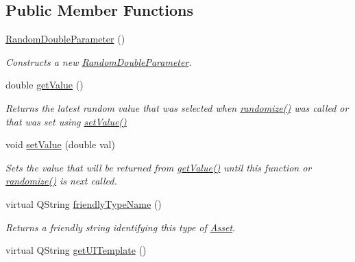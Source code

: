 \subsection*{Public Member Functions}
\begin{DoxyCompactItemize}
\item 
\hyperlink{class_picto_1_1_random_double_parameter_a0ef74a84ce113e2e763e620f9fd0c193}{Random\-Double\-Parameter} ()
\begin{DoxyCompactList}\small\item\em Constructs a new \hyperlink{class_picto_1_1_random_double_parameter}{Random\-Double\-Parameter}. \end{DoxyCompactList}\item 
\hypertarget{class_picto_1_1_random_double_parameter_a42879301cd3f7761460606ab1968e3db}{double \hyperlink{class_picto_1_1_random_double_parameter_a42879301cd3f7761460606ab1968e3db}{get\-Value} ()}\label{class_picto_1_1_random_double_parameter_a42879301cd3f7761460606ab1968e3db}

\begin{DoxyCompactList}\small\item\em Returns the latest random value that was selected when \hyperlink{class_picto_1_1_random_double_parameter_a8de295a1b08b19b4c413419df42fe7e9}{randomize()} was called or that was set using \hyperlink{class_picto_1_1_random_double_parameter_acb6abab52eecd696bf3c490c19054c52}{set\-Value()} \end{DoxyCompactList}\item 
\hypertarget{class_picto_1_1_random_double_parameter_acb6abab52eecd696bf3c490c19054c52}{void \hyperlink{class_picto_1_1_random_double_parameter_acb6abab52eecd696bf3c490c19054c52}{set\-Value} (double val)}\label{class_picto_1_1_random_double_parameter_acb6abab52eecd696bf3c490c19054c52}

\begin{DoxyCompactList}\small\item\em Sets the value that will be returned from \hyperlink{class_picto_1_1_random_double_parameter_a42879301cd3f7761460606ab1968e3db}{get\-Value()} until this function or \hyperlink{class_picto_1_1_random_double_parameter_a8de295a1b08b19b4c413419df42fe7e9}{randomize()} is next called. \end{DoxyCompactList}\item 
virtual Q\-String \hyperlink{class_picto_1_1_random_double_parameter_a9886159308d177c9c0b2d660944a3524}{friendly\-Type\-Name} ()
\begin{DoxyCompactList}\small\item\em Returns a friendly string identifying this type of \hyperlink{class_picto_1_1_asset}{Asset}. \end{DoxyCompactList}\item 
\hypertarget{class_picto_1_1_random_double_parameter_a4325960bd37be7ee2732bd3bd9892738}{virtual Q\-String \hyperlink{class_picto_1_1_random_double_parameter_a4325960bd37be7ee2732bd3bd9892738}{get\-U\-I\-Template} ()}\label{class_picto_1_1_random_double_parameter_a4325960bd37be7ee2732bd3bd9892738}


\end{DoxyCompactItemize}

